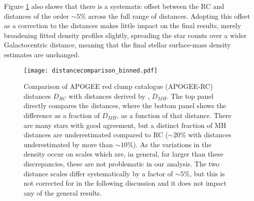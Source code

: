  Figure \ref{fig:distcomp} also shows that there is a systematic offset between the RC and \citet{2014AJ....147..116H} distances of the order $\sim 5\%$ across the full range of distances. Adopting this offset as a correction to the distances makes little impact on the final results, merely broadening fitted density profiles slightly, spreading the star counts over a wider Galactocentric distance, meaning that the final stellar surface-mass density estimates are unchanged.

\begin{figure}
 	\texttt{[image: distancecomparison\_binned.pdf]}
    \caption[Comparison of APOGEE RC catalogue distances with distances derived by \citet{2015ApJ...808..132H}, as used in Chapter \ref{chapter:apogeestruc}]{Comparison of APOGEE red clump catalogue (APOGEE-RC) distances $D_{RC}$ with distances derived by \citet{2015ApJ...808..132H}, $D_{MH}$. The top panel directly compares the distances, where the bottom panel shows the difference as a fraction of $D_{MH}$, as a function of that distance.  There are many stars with good agreement, but a distinct fraction of MH distances are underestimated compared to RC ($\sim 20\%$ with distances underestimated by more than $\sim 10\%$). As the variations in the density occur on scales which are, in general, far larger than these discrepancies, these are not problematic in our analysis. The two distance scales differ systematically by a factor of $\sim 5\%$, but this is not corrected for in the following discussion and it does not impact any of the general results.}
    \label{fig:distcomp}
 \end{figure}


